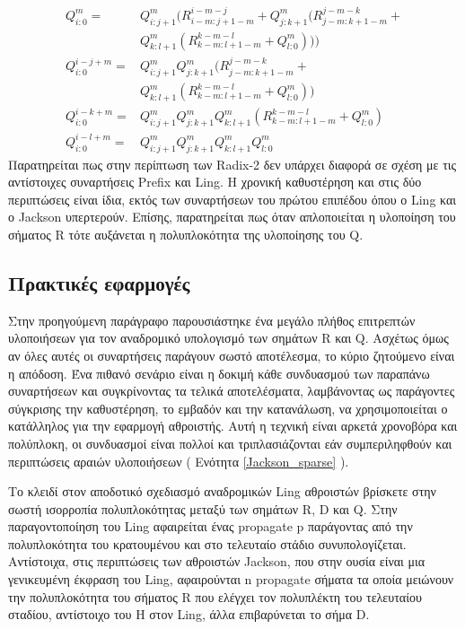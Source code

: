 \begin{equation}
    \begin{split}
        Q^m_{i:0} =& Q^m_{i:j+1}( R^{i-m-j}_{i-m:j+1-m} + Q^m_{j:k+1}( R^{j-m-k}_{j-m:k+1-m} +\\
                   & Q^m_{k:l+1}( R^{k-m-l}_{k-m:l+1-m} + Q^m_{l:0} )))\\
        Q^{i-j+m}_{i:0} =& Q^m_{i:j+1}Q^m_{j:k+1}( R^{j-m-k}_{j-m:k+1-m} +\\
                         & Q^m_{k:l+1}( R^{k-m-l}_{k-m:l+1-m} + Q^m_{l:0} ))\\
        Q^{i-k+m}_{i:0} =& Q^m_{i:j+1}Q^m_{j:k+1}Q^m_{k:l+1}( R^{k-m-l}_{k-m:l+1-m} + Q^m_{l:0} )\\
        Q^{i-l+m}_{i:0} =& Q^m_{i:j+1}Q^m_{j:k+1}Q^m_{k:l+1}Q^m_{l:0}
    \end{split}
\end{equation}
Παρατηρείται πως στην περίπτωση των Radix-2 δεν υπάρχει διαφορά σε σχέση με τις αντίστοιχες συναρτήσεις
Prefix και Ling. Η χρονική καθυστέρηση και στις δύο περιπτώσεις είναι ίδια, εκτός των συναρτήσεων του πρώτου επιπέδου όπου ο Ling και ο Jackson υπερτερούν. Επίσης, παρατηρείται πως όταν απλοποιείται η υλοποίηση του σήματος R τότε αυξάνεται η πολυπλοκότητα της υλοποίησης του Q.












\subsection{Πρακτικές εφαρμογές}
\label{subsection:Jackson_Implementations}
Στην προηγούμενη παράγραφο παρουσιάστηκε ένα μεγάλο πλήθος επιτρεπτών υλοποιήσεων για
τον αναδρομικό υπολογισμό των σημάτων R και Q. Ασχέτως όμως αν όλες αυτές οι συναρτήσεις 
παράγουν σωστό αποτέλεσμα, το κύριο ζητούμενο είναι η απόδοση. Ένα πιθανό σενάριο 
είναι η δοκιμή κάθε συνδυασμού των παραπάνω συναρτήσεων και συγκρίνοντας τα τελικά αποτελέσματα, 
λαμβάνοντας ως παράγοντες σύγκρισης την καθυστέρηση, το εμβαδόν και την κατανάλωση, να
χρησιμοποιείται ο κατάλληλος για την εφαρμογή αθροιστής. Αυτή η τεχνική είναι αρκετά χρονοβόρα 
και πολύπλοκη, οι συνδυασμοί είναι πολλοί και τριπλασιάζονται εάν συμπεριληφθούν και 
περιπτώσεις αραιών υλοποιήσεων ( Ενότητα \ref{Jackson_sparse} ).

Το κλειδί στον αποδοτικό σχεδιασμό αναδρομικών Ling αθροιστών βρίσκετε στην σωστή
ισορροπία πολυπλοκότητας μεταξύ των σημάτων R, D και Q. Στην παραγοντοποίηση του
Ling αφαιρείται ένας propagate p παράγοντας από την πολυπλοκότητα του κρατουμένου 
και στο τελευταίο στάδιο συνυπολογίζεται. Αντίστοιχα, στις περιπτώσεις των αθροιστών 
Jackson, που στην ουσία είναι μια γενικευμένη έκφραση του Ling, αφαιρούνται n propagate
σήματα τα οποία μειώνουν την πολυπλοκότητα του σήματος R που ελέγχει τον πολυπλέκτη 
του τελευταίου σταδίου, αντίστοιχο του H στον Ling, άλλα επιβαρύνεται το σήμα D. 

